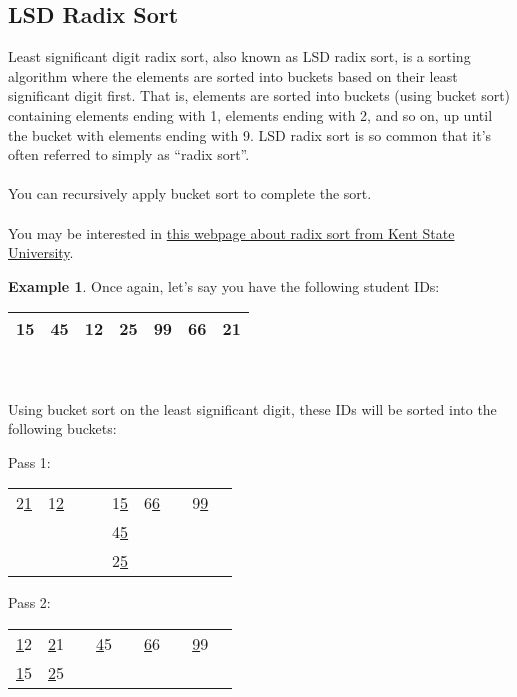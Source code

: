 \documentclass[]{article}
\theoremstyle{definition}
\newtheorem{ex}{Example}[section]
\begin{document}
				\subsection{LSD Radix Sort}
					Least significant digit radix sort, also known as LSD radix sort, is a sorting algorithm where the elements are sorted into buckets based on their least significant digit first. That is, elements are sorted into buckets (using bucket sort) containing elements ending with 1, elements ending with 2, and so on, up until the bucket with elements ending with 9. LSD radix sort is so common that it's often referred to simply as ``radix sort''.
					\\ \\
					You can recursively apply bucket sort to complete the sort.
					\\ \\
					You may be interested in \href{http://www.personal.kent.edu/~rmuhamma/Algorithms/MyAlgorithms/Sorting/radixSort.htm}{this webpage about radix sort from Kent State University}.
					\begin{ex}
						Once again, let's say you have the following student IDs: \begin{tabular}{|c|c|c|c|c|c|c|} \hline 15 & 45 & 12 & 25 & 99 & 66 & 21 \\ \hline \end{tabular}
						\\ \\
						Using bucket sort on the least significant digit, these IDs will be sorted into the following buckets: \\
						\begin{center}
							Pass 1: \begin{tabular}{|c|c|c|c|c|c|c|c|c|}
									\hline
									2\underline{1} & 1\underline{2} & & & 1\underline{5} & 6\underline{6} & & 9\underline{9} \\
									& & & & 4\underline{5} & & & \\
									& & & & 2\underline{5} & & & \\ \hline
								\end{tabular}

							Pass 2: \begin{tabular}{|c|c|c|c|c|c|c|c|c|}
									\hline
									\underline{1}2 & \underline{2}1 & & \underline{4}5 & & \underline{6}6 & & \underline{9}9 \\
									\underline{1}5 & \underline{2}5 & & & & & & \\ \hline
								\end{tabular}
						\end{center}
					\end{ex}
\end{document}
